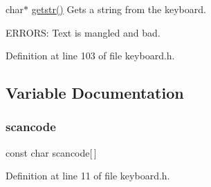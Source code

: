 char$\ast$ \hyperlink{a00023_af63ede2ad39481e059d92df0513f279a_af63ede2ad39481e059d92df0513f279a}{getstr()} Gets a string from the keyboard. 

E\+R\+R\+O\+RS\+: Text is mangled and bad. 

Definition at line 103 of file keyboard.\+h.



\subsection{Variable Documentation}
\mbox{\label{a00023_a995065aa3ec952b9a46d5be5898260d4_a995065aa3ec952b9a46d5be5898260d4}} 
\subsubsection{\texorpdfstring{scancode}{scancode}}
{\footnotesize\ttfamily const char scancode\mbox{[}$\,$\mbox{]}}



Definition at line 11 of file keyboard.\+h.

